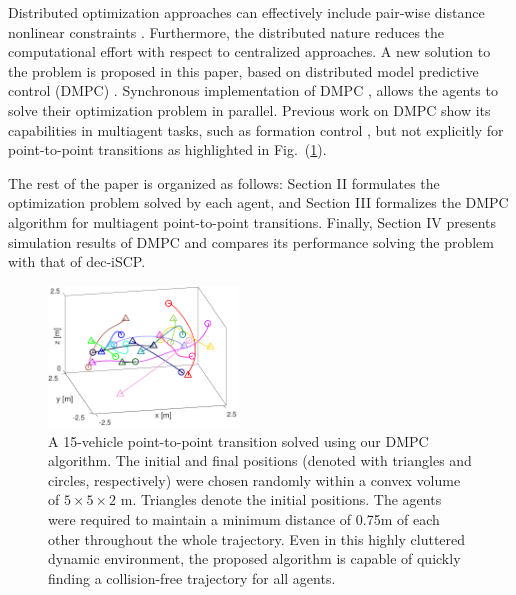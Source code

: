 Distributed optimization approaches can effectively include pair-wise distance nonlinear constraints \cite{bhattacharya2011distributed}. Furthermore, the distributed nature reduces the computational effort with respect to centralized approaches. A new solution to the problem is proposed in this paper, based on distributed model predictive control (DMPC) \cite{camponogara2002distributed}. Synchronous implementation of DMPC \cite{dai2017distributed,wang2014synthesis}, allows the agents to solve their optimization problem in parallel. Previous work on DMPC show its capabilities in multiagent tasks, such as formation control \cite{van2017distributed,sayyaadi2017decentralized}, but not explicitly for point-to-point transitions as highlighted in Fig.~(\ref{fig:30_random}).

The rest of the paper is organized as follows: Section II formulates the optimization problem solved by each agent, and Section III formalizes the DMPC algorithm for multiagent point-to-point transitions. Finally, Section IV presents simulation results of DMPC and compares its performance solving the problem with that of dec-iSCP.

\begin{figure}[t]
	\centering
	\includegraphics[width=0.45\textwidth]{figures/30_rand}
	\caption{A 15-vehicle point-to-point transition solved using our DMPC algorithm. The initial and final positions (denoted with triangles and circles, respectively) were chosen randomly within a convex volume of $5 \times 5 \times 2$ m. Triangles denote the initial positions. The agents were required to maintain a minimum distance of 0.75m of each other throughout the whole trajectory. Even in this highly cluttered dynamic environment, the proposed algorithm is capable of quickly finding a collision-free trajectory for all agents.}
	\label{fig:30_random}
\end{figure}






